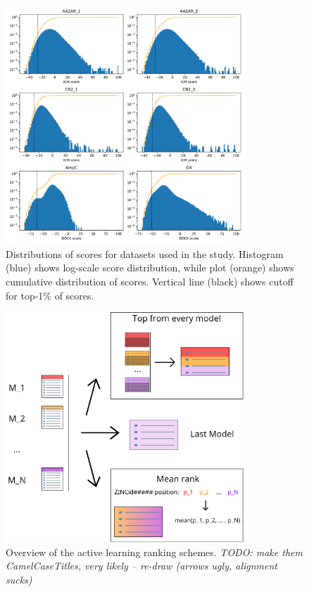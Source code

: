 \begin{figure}[h]
\centering
\includegraphics[width=0.8\textwidth]{figures/figure_1_scores_distribution_v3.pdf}
\caption{Distributions of scores for datasets used in the study. Histogram (blue) shows log-scale score distribution, while plot (orange) shows cumulative distribution of scores. Vertical line (black) shows cutoff for top-1\% of scores.}
\label{fig:fig_1}
\end{figure}


\begin{figure}[h]
\centering
\includegraphics[width=0.8\textwidth]{figures/figure_2_iteration_methods.png}
\caption{Overview of the active learning ranking schemes. \textit{TODO: make them CamelCaseTitles, very likely -- re-draw (arrows ugly, alignment sucks)}}
\label{fig:fig_2_scheme}
\end{figure}


